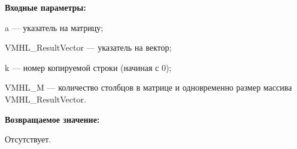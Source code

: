 \textbf{Входные параметры:}  
 
a --- указатель на матрицу;
 
VMHL\_ResultVector --- указатель на вектор;
 
k --- номер копируемой строки (начиная с 0);
 
VMHL\_M --- количество столбцов в матрице и одновременно размер массива VMHL\_ResultVector.

\textbf{Возвращаемое значение:}

Отсутствует.